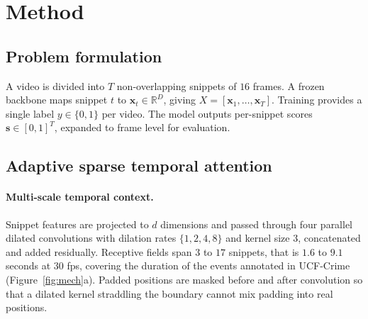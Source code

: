 \documentclass[11pt]{article}
\begin{document}
\section{Method}
\label{sec:method}

\subsection{Problem formulation}
A video is divided into $T$ non-overlapping snippets of $16$ frames. A frozen
backbone maps snippet $t$ to $\mathbf{x}_t \in \mathbb{R}^{D}$, giving
$X = [\mathbf{x}_1,\dots,\mathbf{x}_T]$. Training provides a single label
$y \in \{0,1\}$ per video. The model outputs per-snippet scores
$\mathbf{s} \in [0,1]^{T}$, expanded to frame level for evaluation.

\subsection{Adaptive sparse temporal attention}

\paragraph{Multi-scale temporal context.}
Snippet features are projected to $d$ dimensions and passed through four
parallel dilated convolutions with dilation rates $\{1,2,4,8\}$ and kernel size
$3$, concatenated and added residually. Receptive fields span $3$ to $17$
snippets, that is $1.6$ to $9.1$ seconds at $30$ fps, covering the duration of
the events annotated in UCF-Crime (Figure~\ref{fig:mech}a). Padded positions are masked before and after
convolution so that a dilated kernel straddling the boundary cannot mix padding
into real positions.
\end{document}
